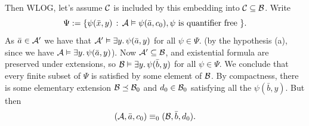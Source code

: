 \documentclass{article}
\numberwithin{thm}{subsection}
\begin{document}
Then WLOG, let's assume $\mathcal{C}$ is included by this embedding into $\mathcal{C} \subseteq \mathcal{B}$. \gap Write \[ \Psi := \{ \psi(\bar x, y) \, : \, \mathcal{A} \vDash \psi(\bar a, c_{0}), \psi \text{ is quantifier free } \}. \] As $\bar a \in \mathcal{A}'$ we have that $\mathcal{A}' \vDash \exists y. \, \psi(\bar a, y)$ for all $\psi \in \Psi$. (by the hypothesis (a), since we have $\mathcal{A} \vDash \exists y. \, \psi(\bar a, y)$). Now $\mathcal{A}' \subseteq \mathcal{B}$, and existential formula are preserved under extensions, so $\mathcal{B} \vDash \exists y. \, \psi(\bar b, y)$ for all $\psi \in \Psi$. \gap We conclude that every finite subset of $\Psi$ is satisfied by some element of $\mathcal{B}$. By compactness, there is some elementary extension $\mathcal{B} \preceq \mathcal{B}_{0}$ and $d_{0} \in \mathcal{B}_{0}$ satisfying all the $\psi(\bar b, y)$. But then \[ (\mathcal{A}, \bar a, c_{0}) \equiv_{0} (\mathcal{B}, \bar b, d_{0}).\]
\endproof
\end{document}
